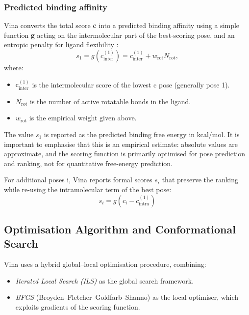 \documentclass[12pt]{article}
\begin{document}
\subsubsection{Predicted binding affinity}

Vina converts the total score \textbf{c} into a predicted binding affinity using a simple function \textbf{g} acting on the intermolecular part of the best-scoring pose, and an entropic penalty for ligand flexibility \cite{CH7_trott2010vina}:
\begin{equation}
  s_1 = g\!\left(c_{\textrm{inter}}^{(1)}\right) = c_{\textrm{inter}}^{(1)} + w_{\textrm{rot}} N_{\textrm{rot}},
\end{equation}
where:
\begin{itemize}
  \item $\textrm{c}_{\textrm{inter}}^{(1)}$ is the intermolecular score of the lowest c pose (generally pose 1).
  \item $N_{\textrm{rot}}$ is the number of active rotatable bonds in the ligand.
  \item $w_{\textrm{rot}}$ is the empirical weight given above.
\end{itemize}

The value $s_1$ is reported as the predicted binding free energy in kcal/mol.  It is important to emphasise that this is an empirical estimate: absolute values are approximate, and the scoring function is primarily optimised for pose prediction and ranking, not for quantitative free-energy prediction\cite{CH7_trott2010vina,CH7_forli2016autodock}.

For additional poses i, Vina reports formal scores $s_i$ that preserve the ranking while re-using the intramolecular term of the best pose:
\begin{equation}
  s_i = g\!\left(c_i - c_{\textrm{intra}}^{(1)}\right)
\end{equation}

\subsection{Optimisation Algorithm and Conformational Search}

Vina uses a hybrid global–local optimisation procedure, combining:
\begin{itemize}
  \item \emph{Iterated Local Search (ILS)} as the global search framework.
  \item \emph{BFGS} (Broyden–Fletcher–Goldfarb–Shanno) as the local optimiser, which exploits gradients of the scoring function.
\end{itemize}
\end{document}
